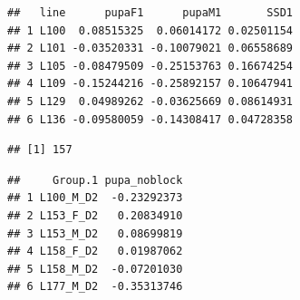 \documentclass[
]{article}
\newenvironment{Shaded}{\begin{snugshade}}{\end{snugshade}}
\newcommand{\CommentTok}[1]{\textcolor[rgb]{0.56,0.35,0.01}{\textit{#1}}}
\newcommand{\DecValTok}[1]{\textcolor[rgb]{0.00,0.00,0.81}{#1}}
\newcommand{\FloatTok}[1]{\textcolor[rgb]{0.00,0.00,0.81}{#1}}
\newcommand{\KeywordTok}[1]{\textcolor[rgb]{0.13,0.29,0.53}{\textbf{#1}}}
\newcommand{\NormalTok}[1]{#1}
\newcommand{\OperatorTok}[1]{\textcolor[rgb]{0.81,0.36,0.00}{\textbf{#1}}}
\newcommand{\StringTok}[1]{\textcolor[rgb]{0.31,0.60,0.02}{#1}}
\begin{document}
\begin{verbatim}
##   line      pupaF1      pupaM1       SSD1
## 1 L100  0.08515325  0.06014172 0.02501154
## 2 L101 -0.03520331 -0.10079021 0.06558689
## 3 L105 -0.08479509 -0.25153763 0.16674254
## 4 L109 -0.15244216 -0.25892157 0.10647941
## 5 L129  0.04989262 -0.03625669 0.08614931
## 6 L136 -0.09580059 -0.14308417 0.04728358
\end{verbatim}

\begin{Shaded}
\end{Shaded}

\begin{verbatim}
## [1] 157
\end{verbatim}

\begin{Shaded}
\end{Shaded}

\begin{verbatim}
##     Group.1 pupa_noblock
## 1 L100_M_D2  -0.23292373
## 2 L153_F_D2   0.20834910
## 3 L153_M_D2   0.08699819
## 4 L158_F_D2   0.01987062
## 5 L158_M_D2  -0.07201030
## 6 L177_M_D2  -0.35313746
\end{verbatim}

\begin{Shaded}
\end{Shaded}
\end{document}
